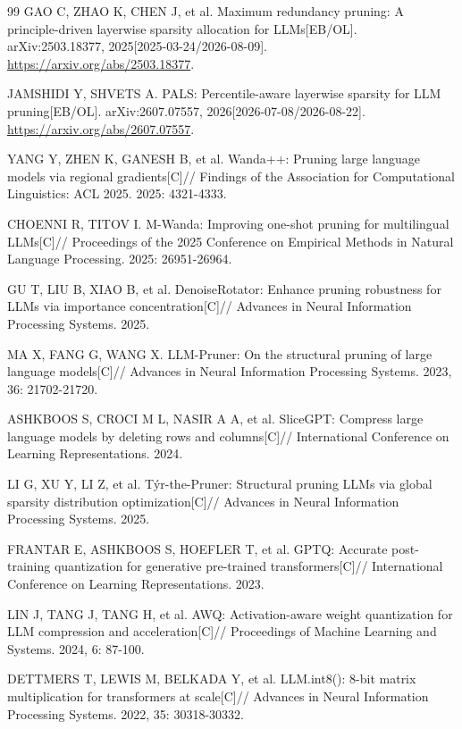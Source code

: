 \begin{thebibliography}{99}
GAO C, ZHAO K, CHEN J, et al.
Maximum redundancy pruning: A principle-driven layerwise sparsity allocation for LLMs[EB/OL].
arXiv:2503.18377, 2025[2025-03-24/2026-08-09].
\url{https://arxiv.org/abs/2503.18377}.

JAMSHIDI Y, SHVETS A.
PALS: Percentile-aware layerwise sparsity for LLM pruning[EB/OL].
arXiv:2607.07557, 2026[2026-07-08/2026-08-22].
\url{https://arxiv.org/abs/2607.07557}.

YANG Y, ZHEN K, GANESH B, et al.
Wanda++: Pruning large language models via regional gradients[C]//
Findings of the Association for Computational Linguistics: ACL 2025.
2025: 4321-4333.

CHOENNI R, TITOV I.
M-Wanda: Improving one-shot pruning for multilingual LLMs[C]//
Proceedings of the 2025 Conference on Empirical Methods in Natural Language Processing.
2025: 26951-26964.

GU T, LIU B, XIAO B, et al.
DenoiseRotator: Enhance pruning robustness for LLMs via importance concentration[C]//
Advances in Neural Information Processing Systems.
2025.

MA X, FANG G, WANG X.
LLM-Pruner: On the structural pruning of large language models[C]//
Advances in Neural Information Processing Systems.
2023, 36: 21702-21720.

ASHKBOOS S, CROCI M L, NASIR A A, et al.
SliceGPT: Compress large language models by deleting rows and columns[C]//
International Conference on Learning Representations.
2024.

LI G, XU Y, LI Z, et al.
T\'yr-the-Pruner: Structural pruning LLMs via global sparsity distribution optimization[C]//
Advances in Neural Information Processing Systems.
2025.

FRANTAR E, ASHKBOOS S, HOEFLER T, et al.
GPTQ: Accurate post-training quantization for generative pre-trained transformers[C]//
International Conference on Learning Representations.
2023.

LIN J, TANG J, TANG H, et al.
AWQ: Activation-aware weight quantization for LLM compression and acceleration[C]//
Proceedings of Machine Learning and Systems.
2024, 6: 87-100.

DETTMERS T, LEWIS M, BELKADA Y, et al.
LLM.int8(): 8-bit matrix multiplication for transformers at scale[C]//
Advances in Neural Information Processing Systems.
2022, 35: 30318-30332.


\end{thebibliography}

